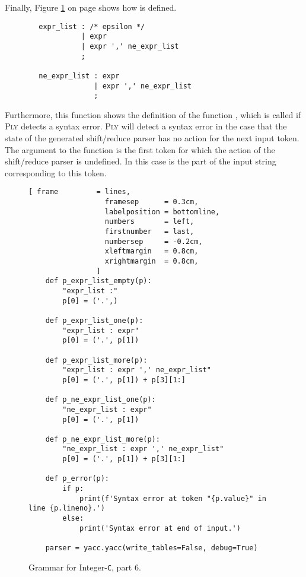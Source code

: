 \noindent
Finally, Figure \ref{fig:Compiler.ipynb-6} on page \pageref{fig:Compiler.ipynb-6} shows how 
is defined.  
\begin{verbatim}
        expr_list : /* epsilon */
                  | expr
                  | expr ',' ne_expr_list
                  ;

        ne_expr_list : expr
                     | expr ',' ne_expr_list
                     ;
\end{verbatim}
Furthermore, this function shows the definition of the function , which is called if
\textsc{Ply} detects a syntax error.  \textsc{Ply} will detect a syntax error in the case that the state of the
generated shift/reduce parser has no action for the next input token.  The argument  to the function
 is the first token for which the action of the shift/reduce parser is undefined.
In this case  is the part of the input string corresponding to this token.

\begin{figure}[!ht]
\centering
\begin{Verbatim}[ frame         = lines, 
                  framesep      = 0.3cm, 
                  labelposition = bottomline,
                  numbers       = left,
                  firstnumber   = last,
                  numbersep     = -0.2cm,
                  xleftmargin   = 0.8cm,
                  xrightmargin  = 0.8cm,
                ]
    def p_expr_list_empty(p):
        "expr_list :"
        p[0] = ('.',)
        
    def p_expr_list_one(p):
        "expr_list : expr"
        p[0] = ('.', p[1])     
    
    def p_expr_list_more(p):
        "expr_list : expr ',' ne_expr_list"
        p[0] = ('.', p[1]) + p[3][1:]     
    
    def p_ne_expr_list_one(p):
        "ne_expr_list : expr"
        p[0] = ('.', p[1]) 
        
    def p_ne_expr_list_more(p):
        "ne_expr_list : expr ',' ne_expr_list"
        p[0] = ('.', p[1]) + p[3][1:] 
    
    def p_error(p):
        if p:
            print(f'Syntax error at token "{p.value}" in line {p.lineno}.')
        else:
            print('Syntax error at end of input.')
    
    parser = yacc.yacc(write_tables=False, debug=True)
\end{Verbatim}
\vspace*{-0.3cm}
\caption{Grammar for Integer-\texttt{C}, part 6.}
\label{fig:Compiler.ipynb-6}
\end{figure}

